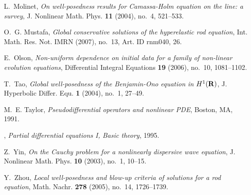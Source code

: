 \documentclass[12pt,reqno]{amsbook}
\numberwithin{section}{chapter}
\numberwithin{equation}{section}  %
\theoremstyle{remark}
\begin{document}
\begin{thebibliography}{HIKK10}
L.~Molinet, \emph{{On well-posedness results for Camassa-Holm equation on the
  line: a survey}}, J. Nonlinear Math. Phys. \textbf{11} (2004), no.~4,
  521--533.

O.~G. Mustafa, \emph{{Global conservative solutions of the hyperelastic rod
  equation}}, Int. Math. Res. Not. IMRN (2007), no.~13, Art. ID rnm040, 26.

E.~Olson, \emph{{Non-uniform dependence on initial data for a family of
  non-linear evolution equations}}, Differential Integral Equations \textbf{19}
  (2006), no.~10, 1081--1102.

T.~Tao, \emph{Global well-posedness of the Benjamin-Ono equation in
  $H^1(\bf R)$}, J. Hyperbolic Differ. Equ. \textbf{1} (2004), no.~1,
  27--49.

M.~E. Taylor, \emph{{Pseudodifferential operators and nonlinear PDE}}, Boston,
  MA, 1991.

\bysame, \emph{{Partial differential equations I, Basic theory}}, 1995.

Z.~Yin, \emph{{On the Cauchy problem for a nonlinearly dispersive wave
  equation}}, J. Nonlinear Math. Phys. \textbf{10} (2003), no.~1, 10--15.

Y.~Zhou, \emph{{Local well-posedness and blow-up criteria of solutions for a
  rod equation}}, Math. Nachr. \textbf{278} (2005), no.~14, 1726--1739.

\end{thebibliography}
%
%
%
%
\end{document}
